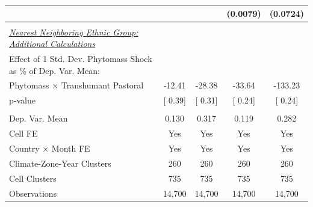 {\begin{tabular}{l*{4}{c}}
                    &               &               &(0.0079)         &(0.0724)         \\
\midrule
\\ \underline{\emph{Nearest Neighboring Ethnic Group: Additional Calculations}} &               &               &               &               \\
[1em] Effect of 1 Std. Dev. Phytomass Shock as $\%$ of Dep. Var. Mean:&               &               &               &               \\
[1em] \hspace{15pt} Phytomass $\times$ Transhumant Pastoral&-12.41         &-28.38         &-33.64         &-133.23         \\
\hspace{15pt} p-value&[     0.39]         &[     0.31]         &[     0.24]         &[     0.24]         \\
\hline \\ Dep. Var. Mean& 0.130         & 0.317         & 0.119         & 0.282         \\
Cell FE             &   Yes         &   Yes         &   Yes         &   Yes         \\
Country $\times$ Month FE&   Yes         &   Yes         &   Yes         &   Yes         \\
Climate-Zone-Year Clusters&   260         &   260         &   260         &   260         \\
Cell Clusters       &   735         &   735         &   735         &   735         \\
Observations        &14,700         &14,700         &14,700         &14,700         \\
\bottomrule
\end{tabular}
}
